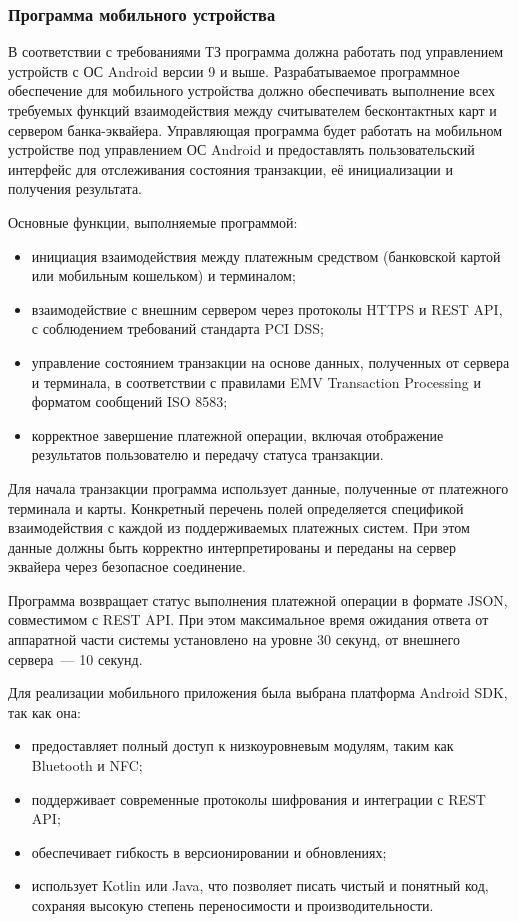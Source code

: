 \subsubsection{Программа мобильного устройства}

В соответствии с требованиями ТЗ программа должна работать под управлением устройств с ОС Android версии 9 и выше.
Разрабатываемое программное обеспечение для мобильного устройства должно обеспечивать выполнение всех требуемых функций взаимодействия между считывателем бесконтактных карт и сервером банка-эквайера.
Управляющая программа будет работать на мобильном устройстве под управлением ОС Android и предоставлять пользовательский интерфейс для отслеживания состояния транзакции, её инициализации и получения результата.

Основные функции, выполняемые программой:
\begin{itemize}
    \item инициация взаимодействия между платежным средством (банковской картой или мобильным кошельком) и терминалом;
    \item взаимодействие с внешним сервером через протоколы HTTPS и REST API, с соблюдением требований стандарта PCI DSS;
    \item управление состоянием транзакции на основе данных, полученных от сервера и терминала, в соответствии с правилами EMV Transaction Processing и форматом сообщений ISO 8583;
    \item корректное завершение платежной операции, включая отображение результатов пользователю и передачу статуса транзакции.
\end{itemize}

Для начала транзакции программа использует данные, полученные от платежного терминала и карты.
Конкретный перечень полей определяется спецификой взаимодействия с каждой из поддерживаемых платежных систем.
При этом данные должны быть корректно интерпретированы и переданы на сервер эквайера через безопасное соединение.

Программа возвращает статус выполнения платежной операции в формате JSON, совместимом с REST API.
При этом максимальное время ожидания ответа от аппаратной части системы установлено на уровне 30 секунд, от внешнего сервера~--- 10 секунд.


Для реализации мобильного приложения была выбрана платформа Android SDK, так как она:
\begin{itemize}
    \item предоставляет полный доступ к низкоуровневым модулям, таким как Bluetooth и NFC;
    \item поддерживает современные протоколы шифрования и интеграции с REST API;
    \item обеспечивает гибкость в версионировании и обновлениях;
    \item использует Kotlin или Java, что позволяет писать чистый и понятный код, сохраняя высокую степень переносимости и производительности.
\end{itemize}

